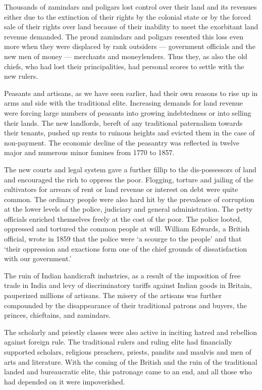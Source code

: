 Thousands of zamindars and poligars lost control over their land and its revenues either due to the extinction of their rights by the colonial state or by the forced sale of their rights over land because of their inability to meet the exorbitant land revenue demanded. The proud zamindars and poligars resented this loss even more when they were displaced by rank outsiders --- government officials and the new men of money --- merchants and moneylenders. Thus they, as also the old chiefs, who had lost their principalities, had personal scores to settle with the new rulers.

Peasants and artisans, as we have seen earlier, had their own reasons to rise up in arms and side with the traditional elite. Increasing demands for land revenue were forcing large numbers of peasants into growing indebtedness or into selling their lands. The new landlords, bereft of any traditional paternalism towards their tenants, pushed up rents to ruinous heights and evicted them in the case of non-payment. The economic decline of the peasantry was reflected in twelve major and numerous minor famines from 1770 to 1857.

The new courts and legal system gave a further fillip to the dis-possessors of land and encouraged the rich to oppress the poor. Flogging, torture and jailing of the cultivators for arrears of rent or land revenue or interest on debt were quite common. The ordinary people were also hard hit by the prevalence of corruption at the lower levels of the police, judiciary and general administration. The petty officials enriched themselves freely at the cost of the poor. The police looted, oppressed and tortured the common people at will. William Edwards, a British official, wrote in 1859 that the police were `a scourge to the people' and that `their oppression and exactions form one of the chief grounds of dissatisfaction with our government.'

The ruin of Indian handicraft industries, as a result of the imposition of free trade in India and levy of discriminatory tariffs against Indian goods in Britain, pauperized millions of artisans. The misery of the artisans was further compounded by the disappearance of their traditional patrons and buyers, the princes, chieftains, and zamindars.

The scholarly and priestly classes were also active in inciting hatred and rebellion against foreign rule. The traditional rulers and ruling elite had financially supported scholars, religious preachers, priests, pandits and maulvis and men of arts and literature. With the coming of the British and the ruin of the traditional landed and bureaucratic elite, this patronage came to an end, and all those who had depended on it were impoverished.

